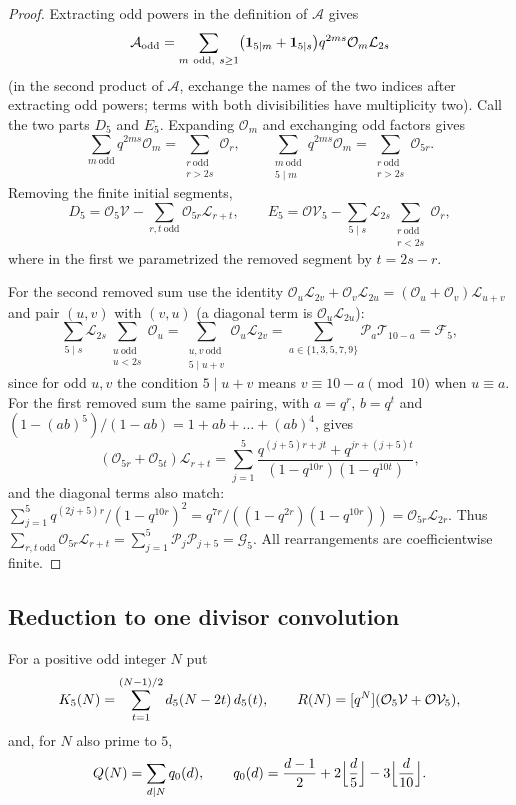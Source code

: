 \begin{proof}
Extracting odd powers in the definition of $\mathcal A$ gives
\[
  \mathcal A_{\mathrm{odd}}=\sum_{m\ \mathrm{odd},\ s\ge1}\bigl(\one_{5\mid m}+\one_{5\mid s}\bigr)q^{2ms}\mathcal O_m\mathcal L_{2s}
\]
(in the second product of $\mathcal A$, exchange the names of the two indices
after extracting odd powers; terms with both divisibilities have multiplicity
two). Call the two parts $D_5$ and $E_5$. Expanding $\mathcal O_m$ and exchanging
odd factors gives
\[
  \sum_{m\ \mathrm{odd}}q^{2ms}\mathcal O_m=\sum_{\substack{r\ \mathrm{odd}\\r>2s}}\mathcal O_r,\qquad
  \sum_{\substack{m\ \mathrm{odd}\\5\mid m}}q^{2ms}\mathcal O_m=\sum_{\substack{r\ \mathrm{odd}\\r>2s}}\mathcal O_{5r}.
\]
Removing the finite initial segments,
\[
  D_5=\mathcal O_5\mathcal V-\sum_{r,t\ \mathrm{odd}}\mathcal O_{5r}\mathcal L_{r+t},\qquad
  E_5=\mathcal O\mathcal V_5-\sum_{5\mid s}\mathcal L_{2s}\sum_{\substack{r\ \mathrm{odd}\\r<2s}}\mathcal O_r ,
\]
where in the first we parametrized the removed segment by $t=2s-r$.

For the second removed sum use the identity
$\mathcal O_u\mathcal L_{2v}+\mathcal O_v\mathcal L_{2u}=(\mathcal O_u+\mathcal O_v)\mathcal L_{u+v}$ and
pair $(u,v)$ with $(v,u)$ (a diagonal term is $\mathcal O_u\mathcal L_{2u}$):
\[
  \sum_{5\mid s}\mathcal L_{2s}\sum_{\substack{u\ \mathrm{odd}\\u<2s}}\mathcal O_u
  =\sum_{\substack{u,v\ \mathrm{odd}\\5\mid u+v}}\mathcal O_u\mathcal L_{2v}
  =\sum_{a\in\{1,3,5,7,9\}}\mathcal P_a\mathcal T_{10-a}=\mathcal F_5,
\]
since for odd $u,v$ the condition $5\mid u+v$ means $v\equiv10-a\pmod{10}$ when
$u\equiv a$. For the first removed sum the same pairing, with $a=q^r$, $b=q^t$ and
$(1-(ab)^5)/(1-ab)=1+ab+\dots+(ab)^4$, gives
\[
  (\mathcal O_{5r}+\mathcal O_{5t})\mathcal L_{r+t}=\sum_{j=1}^5\frac{q^{(j+5)r+jt}+q^{jr+(j+5)t}}{(1-q^{10r})(1-q^{10t})},
\]
and the diagonal terms also match:
$\sum_{j=1}^5q^{(2j+5)r}/(1-q^{10r})^2=q^{7r}/((1-q^{2r})(1-q^{10r}))=\mathcal O_{5r}\mathcal L_{2r}$.
Thus $\sum_{r,t\ \mathrm{odd}}\mathcal O_{5r}\mathcal L_{r+t}=\sum_{j=1}^5\mathcal P_j\mathcal P_{j+5}=\mathcal G_5$.
All rearrangements are coefficientwise finite.
\end{proof}

\subsection{Reduction to one divisor convolution}
For a positive odd integer $N$ put
\[
  K_5(N)=\sum_{t=1}^{(N-1)/2}d_5(N-2t)\,d_5(t),\qquad
  R(N)=[q^{N}](\mathcal O_5\mathcal V+\mathcal O\mathcal V_5),
\]
and, for $N$ also prime to $5$,
\[
  Q(N)=\sum_{d\mid N}q_0(d),\qquad
  q_0(d)=\frac{d-1}2+2\Bigl\lfloor\frac d5\Bigr\rfloor-3\Bigl\lfloor\frac d{10}\Bigr\rfloor .
\]

